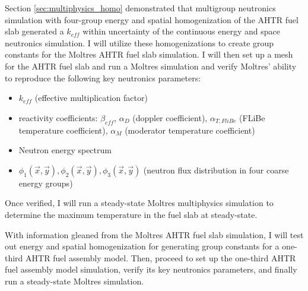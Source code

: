 Section \ref{sec:multiphysics_homo} demonstrated that multigroup neutronics 
simulation with four-group energy and spatial homogenization of the \gls{AHTR} 
fuel slab generated a $k_{eff}$ within uncertainty of the continuous energy and 
space neutronics simulation. I will utilize these homogenizations to create 
group constants for the Moltres \gls{AHTR} fuel slab simulation. I will then 
set up a mesh for the \gls{AHTR} fuel slab and run a Moltres simulation and 
verify Moltres' ability to reproduce the following key neutronics parameters: 
\begin{itemize}
  \item $k_{eff}$ (effective multiplication factor)
  \item reactivity coefficients: $\beta_{eff}$, $\alpha_D$ (doppler coefficient), 
  $\alpha_{T, FliBe}$ (\gls{FLiBe} temperature coefficient), $\alpha_{M}$ 
  (moderator temperature coefficient)
  \item Neutron energy spectrum 
  \item $\phi_1(\vec{x},\vec{y}), \phi_2(\vec{x},\vec{y}), \phi_3(\vec{x},\vec{y})$ 
  (neutron flux distribution in four coarse energy groups) 
\end{itemize}
Once verified, I will run a steady-state Moltres multiphysics simulation to 
determine the maximum temperature in the fuel slab at steady-state. 

With information gleaned from the Moltres \gls{AHTR} fuel slab simulation, I 
will test out energy and spatial homogenization for generating group constants 
for a one-third \gls{AHTR} fuel assembly model.  
Then, proceed to set up the one-third \gls{AHTR} fuel assembly model simulation, 
verify its key neutronics parameters, and finally run a steady-state Moltres 
simulation.

